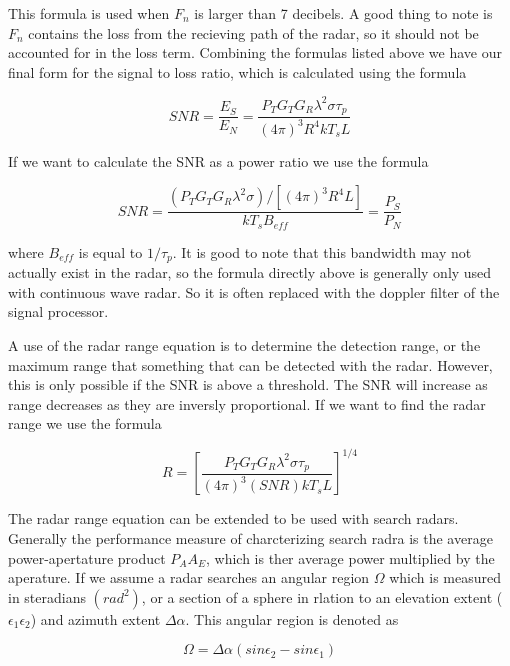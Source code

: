 \documentclass[12pt]{article}
\begin{document}
This formula is used when $F_n$ is larger than 7 decibels. A good thing to note is $F_n$ contains the loss from the recieving path of the radar, so it should not be accounted for in the loss term. Combining the formulas listed above we have our final form for the signal to loss ratio, which is calculated using the formula

\begin{equation}
    SNR = \frac{E_S}{E_N} = \frac{P_T G_T G_R \lambda^2 \sigma \tau_p}{ (4 \pi)^3 R^4 k T_s L }
\end{equation}

If we want to calculate the SNR as a power ratio we use the formula 

\begin{equation}
    SNR = \frac{ (P_T G_T G_R \lambda^2 \sigma) / \left[ (4 \pi)^3 R^4 L \right] }{k T_s B_{eff}} = \frac{P_S}{P_N}
\end{equation}

where $B_{eff}$ is equal to $1 / \tau_p$. It is good to note that this bandwidth may not actually exist in the radar, so the formula directly above is generally only used with continuous wave radar. So it is often replaced with the doppler filter of the signal processor.

A use of the radar range equation is to determine the detection range, or the maximum range that something that can be detected with the radar. However, this is only possible if the SNR is above a threshold. The SNR will increase as range decreases as they are inversly proportional. If we want to find the radar range we use the formula 

\begin{equation}
    R = \left[ \frac{P_T G_T G_R \lambda^2 \sigma \tau_p}{(4 \pi)^3 (SNR) k T_s L} \right]^{1/4}
\end{equation}

The radar range equation can be extended to be used with search radars. Generally the performance measure of charcterizing search radra is the average power-apertature product $P_A A_E$, which is ther average power multiplied by the aperature. If we assume a radar searches an angular region $\Omega$ which is measured in steradians $({rad}^2)$, or a section of a sphere in rlation to an elevation extent ($\epsilon_1 \epsilon_2$) and azimuth extent $\Delta \alpha$. This angular region is denoted as 

\begin{equation}
    \Omega = \Delta \alpha(sin \epsilon_2 - sin \epsilon_1)
\end{equation}
\end{document}
